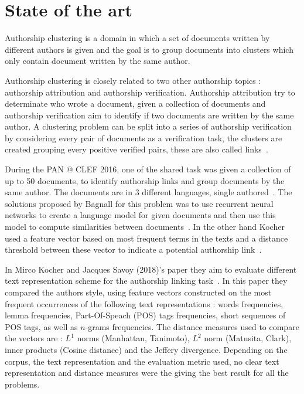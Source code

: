 \section{State of the art \label{sec:state_of_the_art}}

Authorship clustering is a domain in which a set of documents written by different authors is given and the goal is to group documents into clusters which only contain document written by the same author.

Authorship clustering is closely related to two other authorship topics : authorship attribution and authorship verification.
Authorship attribution try to determinate who wrote a document, given a collection of documents and authorship verification aim to identify if two documents are written by the same author.
A clustering problem can be split into a series of authorship verification by considering every pair of documents as a verification task, the clusters are created grouping every positive verified pairs, these are also called links~\cite{pan16_clustering_site}.

During the PAN @ CLEF 2016, one of the shared task was given a collection of up to 50 documents, to identify authorship links and group documents by the same author.
The documents are in 3 different languages, single authored~\cite{pan16}.
The solutions proposed by Bagnall for this problem was to use recurrent neural networks to create a language model for given documents and then use this model to compute similarities between documents~\cite{bagnall_pan16}.
In the other hand Kocher used a feature vector based on most frequent terms in the texts and a distance threshold between these vector to indicate a potential authorship link~\cite{kocher_pan16}.

In Mirco Kocher and Jacques Savoy (2018)'s paper they aim to evaluate different text representation scheme for the authorship linking task~\cite{kocher_verification}.
In this paper they compared the authors style, using feature vectors constructed on the most frequent occurrences of the following text representations : words frequencies, lemma frequencies, Part-Of-Speach (POS) tags frequencies, short sequences of POS tags, as well as $n$-grams frequencies.
The distance measures used to compare the vectors are : $L^1$ norms (Manhattan, Tanimoto), $L^2$ norm (Matusita, Clark), inner products (Cosine distance) and the Jeffery divergence.
Depending on the corpus, the text representation and the evaluation metric used, no clear text representation and distance measures were the giving the best result for all the problems.


